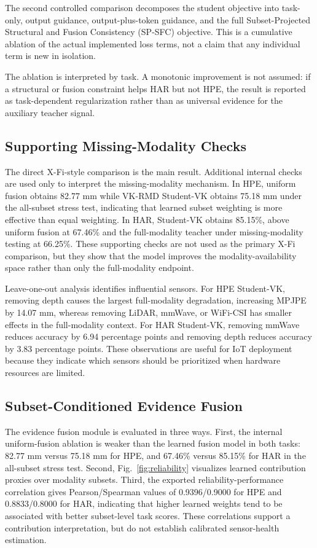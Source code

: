 ﻿\documentclass[journal]{IEEEtran}
\newcommand{\method}{VK-RMD}
\newcommand{\mpjpe}{MPJPE}
\begin{document}
The second controlled comparison decomposes the student objective into task-only, output guidance, output-plus-token guidance, and the full Subset-Projected Structural and Fusion Consistency (SP-SFC) objective. This is a cumulative ablation of the actual implemented loss terms, not a claim that any individual term is new in isolation.



The ablation is interpreted by task. A monotonic improvement is not assumed: if a structural or fusion constraint helps HAR but not HPE, the result is reported as task-dependent regularization rather than as universal evidence for the auxiliary teacher signal.

\subsection{Supporting Missing-Modality Checks}
The direct X-Fi-style comparison is the main result. Additional internal checks are used only to interpret the missing-modality mechanism. In HPE, uniform fusion obtains 82.77 mm while \method{} Student-VK obtains 75.18 mm under the all-subset stress test, indicating that learned subset weighting is more effective than equal weighting. In HAR, Student-VK obtains 85.15\%, above uniform fusion at 67.46\% and the full-modality teacher under missing-modality testing at 66.25\%. These supporting checks are not used as the primary X-Fi comparison, but they show that the model improves the modality-availability space rather than only the full-modality endpoint.

Leave-one-out analysis identifies influential sensors. For HPE Student-VK, removing depth causes the largest full-modality degradation, increasing \mpjpe{} by 14.07 mm, whereas removing LiDAR, mmWave, or WiFi-CSI has smaller effects in the full-modality context. For HAR Student-VK, removing mmWave reduces accuracy by 6.94 percentage points and removing depth reduces accuracy by 3.83 percentage points. These observations are useful for IoT deployment because they indicate which sensors should be prioritized when hardware resources are limited.

\subsection{Subset-Conditioned Evidence Fusion}
The evidence fusion module is evaluated in three ways. First, the internal uniform-fusion ablation is weaker than the learned fusion model in both tasks: 82.77 mm versus 75.18 mm for HPE, and 67.46\% versus 85.15\% for HAR in the all-subset stress test. Second, Fig.~\ref{fig:reliability} visualizes learned contribution proxies over modality subsets. Third, the exported reliability-performance correlation gives Pearson/Spearman values of 0.9396/0.9000 for HPE and 0.8833/0.8000 for HAR, indicating that higher learned weights tend to be associated with better subset-level task scores. These correlations support a contribution interpretation, but do not establish calibrated sensor-health estimation.
\end{document}
